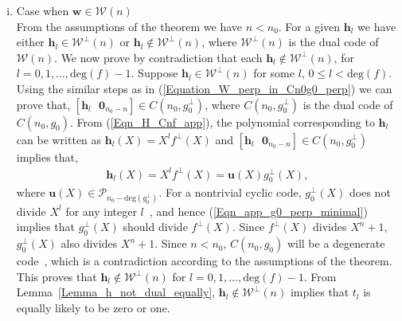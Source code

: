 \documentclass[10pt,journal]{IEEEtran}
\def \deg{{\mathrm{deg}}}
\begin{document}
\begin{enumerate}[(i)]
%  
\item Case when $\mathbf{w}\in \mathcal{W}(n)$ \\
From the assumptions of the theorem we have $n < n_0$.
For a given $\mathbf{h}_l$ we have either $\mathbf{h}_l \in \mathcal{W}^{\perp}(n)$ or
$\mathbf{h}_l \notin \mathcal{W}^{\perp}(n)$, where $\mathcal{W}^{\perp}(n)$ is the dual code of $\mathcal{W}(n)$. 
We now prove by contradiction that each $\mathbf{h}_l \notin \mathcal{W}^{\perp}(n)$, for $l = 0,1,\ldots, \deg(f)-1$.
Suppose $\mathbf{h}_l \in \mathcal{W}^{\perp}(n)$ for some $l$, $0 \leq l < \deg(f)$.
Using the similar steps as in (\ref{Equation_W_perp_in_Cn0g0_perp}) we can prove that, 
$[\mathbf{h}_l \mbox{~~} \mathbf{0}_{n_0-n}] \in C(n_0,g_0^{\perp})$, where $C(n_0,g_0^{\perp})$ is the dual code of 
$C(n_0,g_0)$. From (\ref{Eqn_H_Cnf_app}), 
the polynomial corresponding to $\mathbf{h}_l$ can be written as $\mathbf{h}_l(X) =  X^l f^{\perp}(X)$
and $[\mathbf{h}_l \mbox{~~} \mathbf{0}_{n_0-n}] \in C(n_0,g_0^{\perp})$ implies that,
% 
\begin{align}
%  
\mathbf{h}_l(X) = X^l f^{\perp}(X) = \mathbf{u}(X)g_0^{\perp}(X),
\label{Eqn_app_g0_perp_minimal}
% 
\end{align}
% 
where $\mathbf{u}(X) \in \mathcal{P}_{n_0-\deg(g_0^{\perp})}$.
For a nontrivial cyclic code, $g_0^{\perp}(X)$ does not divide $X^l$ for any integer $l$~\cite{LinCostello2004}, and 
hence (\ref{Eqn_app_g0_perp_minimal}) implies that $g_0^{\perp}(X)$ should divide $f^{\perp}(X)$.
Since $f^{\perp}(X)$ divides $X^n+1$, $g_0^{\perp}(X)$ also divides $X^n+1$.
Since $n < n_0$, $C(n_0,g_0)$ will be a degenerate code~\cite[Sec.~8.3]{Macwilliams_Sloane_1977}, 
which is a contradiction according to the assumptions of the theorem. 
This proves that $\mathbf{h}_l \notin \mathcal{W}^{\perp}(n)$ for $l = 0,1,\ldots, \deg(f)-1$.
From Lemma~\ref{Lemma_h_not_dual_equally}, $\mathbf{h}_l \notin \mathcal{W}^{\perp}(n)$ implies that $t_l$ 
is equally likely to be zero or one.



\end{enumerate}
\end{document}
